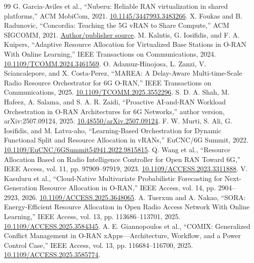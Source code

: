 \documentclass[10pt,a4paper]{article}
\begin{document}
\begin{thebibliography}{99}
 G. Garcia-Aviles et al., ``Nuberu: Reliable RAN virtualization in shared platforms,'' ACM MobiCom, 2021. \href{https://doi.org/10.1145/3447993.3483266}{10.1145/3447993.3483266}.
 X. Foukas and B. Radunovic, ``Concordia: Teaching the 5G vRAN to Share Compute,'' ACM SIGCOMM, 2021. \href{https://www.microsoft.com/en-us/research/publication/concordia-teaching-the-5g-vran-to-share-compute/}{Author/publisher source}.
 M. Kalntis, G. Iosifidis, and F. A. Kuipers, ``Adaptive Resource Allocation for Virtualized Base Stations in O-RAN With Online Learning,'' IEEE Transactions on Communications, 2024. \href{https://doi.org/10.1109/TCOMM.2024.3461569}{10.1109/TCOMM.2024.3461569}.
 O. Adamuz-Hinojosa, L. Zanzi, V. Sciancalepore, and X. Costa-Perez, ``MAREA: A Delay-Aware Multi-time-Scale Radio Resource Orchestrator for 6G O-RAN,'' IEEE Transactions on Communications, 2025. \href{https://doi.org/10.1109/TCOMM.2025.3552296}{10.1109/TCOMM.2025.3552296}.
 S. D. A. Shah, M. Hafeez, A. Salama, and S. A. R. Zaidi, ``Proactive AI-and-RAN Workload Orchestration in O-RAN Architectures for 6G Networks,'' author version, arXiv:2507.09124, 2025. \href{https://doi.org/10.48550/arXiv.2507.09124}{10.48550/arXiv.2507.09124}.
 F. W. Murti, S. Ali, G. Iosifidis, and M. Latva-aho, ``Learning-Based Orchestration for Dynamic Functional Split and Resource Allocation in vRANs,'' EuCNC/6G Summit, 2022. \href{https://doi.org/10.1109/EuCNC/6GSummit54941.2022.9815815}{10.1109/EuCNC/6GSummit54941.2022.9815815}.
 Q. Wang et al., ``Resource Allocation Based on Radio Intelligence Controller for Open RAN Toward 6G,'' IEEE Access, vol. 11, pp. 97909--97919, 2023. \href{https://doi.org/10.1109/ACCESS.2023.3311888}{10.1109/ACCESS.2023.3311888}.
 V. Kasuluru et al., ``Cloud-Native Multivariate Probabilistic Forecasting for Next-Generation Resource Allocation in O-RAN,'' IEEE Access, vol. 14, pp. 2904--2923, 2026. \href{https://doi.org/10.1109/ACCESS.2025.3648065}{10.1109/ACCESS.2025.3648065}.
 A. Tuerxun and A. Nakao, ``SORA: Energy-Efficient Resource Allocation in Open Radio Access Network With Online Learning,'' IEEE Access, vol. 13, pp. 113686--113701, 2025. \href{https://doi.org/10.1109/ACCESS.2025.3584345}{10.1109/ACCESS.2025.3584345}.
 A. E. Giannopoulos et al., ``COMIX: Generalized Conflict Management in O-RAN xApps---Architecture, Workflow, and a Power Control Case,'' IEEE Access, vol. 13, pp. 116684--116700, 2025. \href{https://doi.org/10.1109/ACCESS.2025.3585774}{10.1109/ACCESS.2025.3585774}.

\end{thebibliography}
\end{document}
